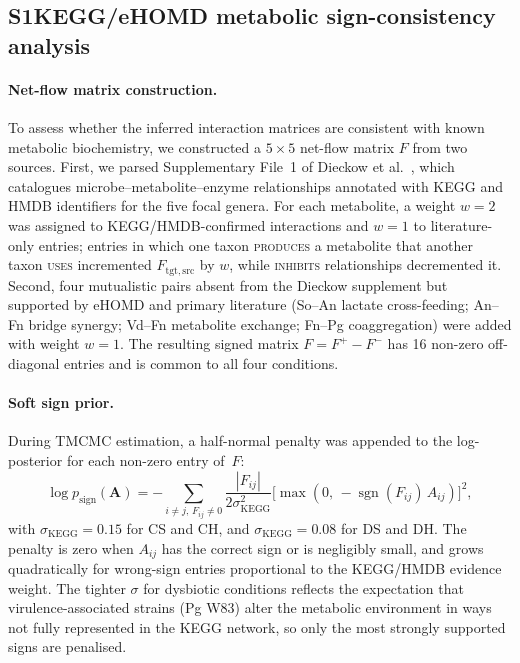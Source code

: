 \documentclass[11pt,a4paper]{article}
\begin{document}
\subsection*{S1\quad KEGG/eHOMD metabolic sign-consistency analysis}
\label{sec:supp_kegg}

\paragraph{Net-flow matrix construction.}
To assess whether the inferred interaction matrices are consistent with known metabolic biochemistry, we constructed a $5\times5$ net-flow matrix $F$ from two sources.
First, we parsed Supplementary File~1 of Dieckow et al.~\cite{Dieckow2025InVivo}, which catalogues microbe--metabolite--enzyme relationships annotated with KEGG and HMDB identifiers for the five focal genera.
For each metabolite, a weight $w=2$ was assigned to KEGG/HMDB-confirmed interactions and $w=1$ to literature-only entries; entries in which one taxon \textsc{produces} a metabolite that another taxon \textsc{uses} incremented $F_{\mathrm{tgt,src}}$ by $w$, while \textsc{inhibits} relationships decremented it.
Second, four mutualistic pairs absent from the Dieckow supplement but supported by eHOMD and primary literature (So--An lactate cross-feeding; An--Fn bridge synergy; Vd--Fn metabolite exchange; Fn--Pg coaggregation) were added with weight $w=1$.
The resulting signed matrix $F = F^+ - F^-$ has 16 non-zero off-diagonal entries and is common to all four conditions.

\paragraph{Soft sign prior.}
During TMCMC estimation, a half-normal penalty was appended to the log-posterior for each non-zero entry of~$F$:
\begin{equation}
  \log p_{\mathrm{sign}}(\mathbf{A}) =
  -\sum_{i \neq j,\, F_{ij}\neq 0}
  \frac{|F_{ij}|}{2\sigma_{\mathrm{KEGG}}^2}
  \bigl[\max(0,\,-\operatorname{sgn}(F_{ij})\,A_{ij})\bigr]^2,
  \label{eq:sign_prior}
\end{equation}
with $\sigma_{\mathrm{KEGG}}=0.15$ for CS and CH, and $\sigma_{\mathrm{KEGG}}=0.08$ for DS and DH.
The penalty is zero when $A_{ij}$ has the correct sign or is negligibly small, and grows quadratically for wrong-sign entries proportional to the KEGG/HMDB evidence weight.
The tighter $\sigma$ for dysbiotic conditions reflects the expectation that virulence-associated strains (Pg W83) alter the metabolic environment in ways not fully represented in the KEGG network, so only the most strongly supported signs are penalised.
\end{document}
